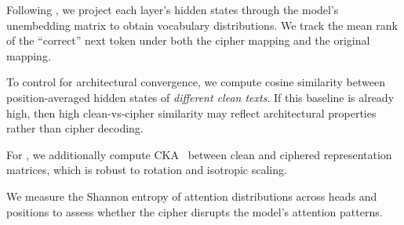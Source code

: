  Following \citet{nostalgebraist2020logitlens}, we project each layer's hidden states through the model's unembedding matrix to obtain vocabulary distributions. We track the mean rank of the ``correct'' next token under both the cipher mapping and the original mapping.

 To control for architectural convergence, we compute cosine similarity between position-averaged hidden states of \emph{different clean texts}. If this baseline is already high, then high clean-vs-cipher similarity may reflect architectural properties rather than cipher decoding.

 For \pythia, we additionally compute CKA~\citep{kornblith2019similarity} between clean and ciphered representation matrices, which is robust to rotation and isotropic scaling.

 We measure the Shannon entropy of attention distributions across heads and positions to assess whether the cipher disrupts the model's attention patterns.
